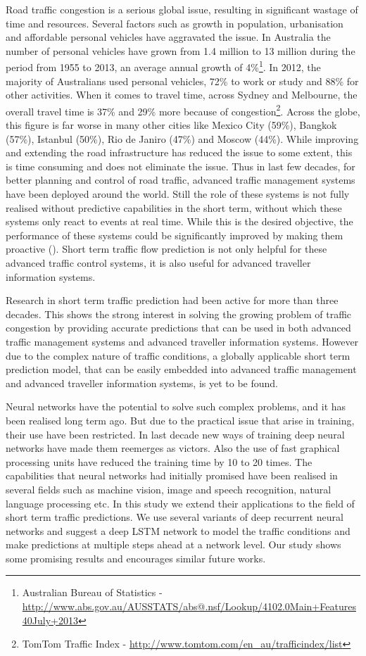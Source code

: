 Road traffic congestion is a serious global issue, resulting in significant wastage of time and
resources. Several factors such as growth in population, urbanisation and affordable personal vehicles
have aggravated the issue. In Australia the number of personal vehicles have grown from 1.4 million
to 13 million during the period from 1955 to 2013, an average annual growth of 4\%\footnote{Australian
Bureau of Statistics - \url{http://www.abs.gov.au/AUSSTATS/abs@.nsf/Lookup/4102.0Main+Features40July+2013}}.
In 2012, the majority of Australians used personal vehicles, 72\% to work or study and 88\% for other activities.
When it comes to travel time, across Sydney and Melbourne, the overall travel time is 37\% and 29\% more because of
congestion\footnote{TomTom Traffic Index - \url{http://www.tomtom.com/en_au/trafficindex/list}}.
Across the globe, this figure is far worse in many other cities like Mexico City (59\%), Bangkok (57\%),
Istanbul (50\%), Rio de Janiro (47\%) and Moscow (44\%). While improving and extending the road infrastructure has
reduced the issue to some extent, this is time consuming and does not eliminate the issue.
Thus in last few decades, for better planning and control of road traffic, advanced traffic
management systems have been deployed around the world. Still the role of these systems is not
fully realised without predictive capabilities in the short term, without which these systems only
react to events at real time. While this is the desired objective, the performance of these systems
could be significantly improved by making them proactive (\citet{smith1997traffic}). Short term traffic
flow prediction is not only helpful for these advanced traffic control systems, it is also useful
for advanced traveller information systems.


Research in short term traffic prediction had been active for more than three decades. This shows the
strong interest in solving the growing problem of traffic congestion by providing accurate predictions
that can be used in both advanced traffic management systems and advanced traveller information systems.
However due to the complex nature of traffic conditions, a globally applicable short term prediction
model, that can be easily embedded into advanced traffic management and advanced traveller information
systems, is yet to be found.

Neural networks have the potential to solve such complex problems, and it has been realised long term
ago. But due to the practical issue that arise in training, their use have been restricted. In last
decade new ways of training deep neural networks have made them reemerges as victors. Also the use
of fast graphical processing units have reduced the training time by 10 to 20 times. The capabilities
that neural networks had initially promised have been realised in several fields such as machine
vision, image and speech recognition, natural language processing etc. In this study we extend their
applications to the field of short term traffic predictions. We use several variants of deep recurrent
neural networks and suggest a deep LSTM network to model the traffic conditions and make predictions
at multiple steps ahead at a network level. Our study shows some promising results and encourages
similar future works.


